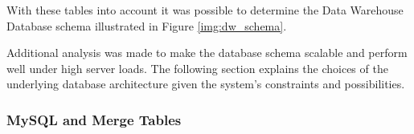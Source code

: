 
With these tables into account it was possible to determine the Data Warehouse
Database schema illustrated in Figure \ref{img:dw_schema}.

Additional analysis was made to make the database schema scalable and perform
well under high server loads. The following section explains the choices of
the underlying database architecture given the system's constraints and
possibilities.

\subsubsection{MySQL and Merge Tables}\label{ssec:mysql_merge}


